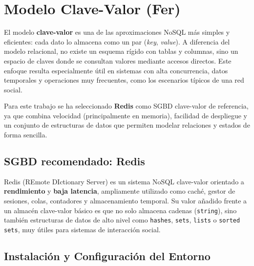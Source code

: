 
\chapter{Modelo Clave-Valor (Fer)}
\label{ch:fer}

El modelo \textbf{clave-valor} es una de las aproximaciones NoSQL más simples y eficientes: cada dato lo almacena como un par (\textit{key}, \textit{value}). A diferencia del modelo relacional, no existe un esquema rígido con tablas y columnas, sino un espacio de claves donde se consultan valores mediante accesos directos. Este enfoque resulta especialmente útil en sistemas con alta concurrencia, datos temporales y operaciones muy frecuentes, como los escenarios típicos de una red social.

Para este trabajo se ha seleccionado \textbf{Redis} como SGBD clave-valor de referencia, ya que combina velocidad (principalmente en memoria), facilidad de despliegue y un conjunto de estructuras de datos que permiten modelar relaciones y estados de forma sencilla.

\section{SGBD recomendado: Redis}

Redis (REmote DIctionary Server) es un sistema NoSQL clave-valor orientado a \textbf{rendimiento} y \textbf{baja latencia}, ampliamente utilizado como caché, gestor de sesiones, colas, contadores y almacenamiento temporal. Su valor añadido frente a un almacén clave-valor básico es que no solo almacena cadenas (\texttt{string}), sino también estructuras de datos de alto nivel como \texttt{hashes}, \texttt{sets}, \texttt{lists} o \texttt{sorted sets}, muy útiles para sistemas de interacción social.

\section{Instalación y Configuración del Entorno}

